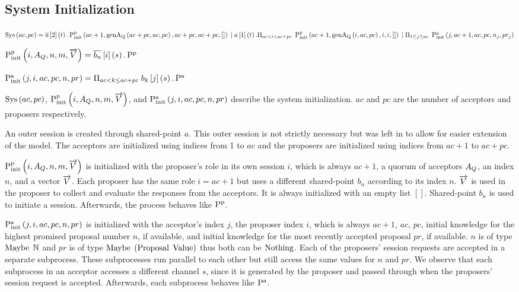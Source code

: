 \subsection{System Initialization}
$\operatorname{Sys}\left(ac, pc\right) = \overline{a}\left[2\right]\left(t\right) . \operatorname{P^p_{init}}\left(ac + 1, \operatorname{genA_Q}\left(ac + pc, ac, pc\right), ac + pc, ac + pc, []\right)\\
\; | \; a\left[1\right]\left(t\right) . \Pi_{ac < i < ac + pc}\; \operatorname{P^p_{init}}\left(ac + 1, \operatorname{genA_Q}\left(i, ac, pc\right), i, i, []\right) \\
\; | \; \Pi_{1 \le j \le ac}\; \operatorname{P^a_{init}}\left(j, ac + 1, ac, pc, n_j, pr_j\right)$

$\operatorname{P^p_{init}}\left(i, A_Q, n, m, \overrightarrow{V}\right) = \overline{b_n}\left[i\right]\left(s\right) . \operatorname{P^p}$

$\operatorname{P^a_{init}}\left(j, i, ac, pc, n, pr\right) = \Pi_{ac < k \le ac + pc}\; b_k\left[j\right]\left(s\right) . \operatorname{P^a}$

$\operatorname{Sys}\left(ac, pc\right)$, $\operatorname{P^p_{init}}\left(i, A_Q, n, m, \overrightarrow{V}\right)$, and $\operatorname{P^a_{init}}\left(j, i, ac, pc, n, pr\right)$ describe the system initialization.
$ac$ and $pc$ are the number of acceptors and proposers respectively.

An outer session is created through shared-point $a$.
This outer session is not strictly necessary but was left in to allow for easier extension of the model.
The acceptors are initialized using indices from 1 to $ac$ and the proposers are initialized using indices from $ac + 1$ to $ac + pc$.

$\operatorname{P^p_{init}}\left(i, A_Q, n, m, \overrightarrow{V}\right)$ is initialized with the proposer's role in its own session $i$, which is always $ac + 1$, a quorum of acceptors $A_Q$, an index $n$, and a vector $\overrightarrow{V}$.
Each proposer has the same role $i = ac + 1$ but uses a different shared-point $b_n$ according to its index $n$.
$\overrightarrow{V}$ is used in the proposer to collect and evaluate the responses from the acceptors.
It is always initialized with an empty list $[]$.
Shared-point $b_n$ is used to initiate a session.
Afterwards, the process behaves like $\operatorname{P^p}$.

$\operatorname{P^a_{init}}\left(j, i, ac, pc, n, pr\right)$ is initialized with the acceptor's index $j$, the proposer index $i$, which is always $ac + 1$, $ac$, $pc$, initial knowledge for the highest promised proposal number $n$, if available, and initial knowledge for the most recently accepted proposal $pr$, if available.
$n$ is of type $\operatorname{Maybe}\; \mathbb{N}$ and $pr$ is of type $\operatorname{Maybe}\; \left(\operatorname{Proposal}\; \operatorname{Value}\right)$ thus both can be $\operatorname{Nothing}$.
Each of the proposers' session requests are accepted in a separate subprocess.
These subprocesses run parallel to each other but still access the same values for $n$ and $pr$.
We observe that each subprocess in an acceptor accesses a different channel $s$, since it is generated by the proposer and passed through when the proposers' session request is accepted.
Afterwards, each subprocess behaves like $\operatorname{P^a}$.

